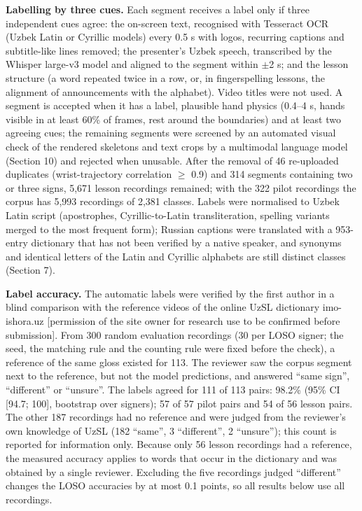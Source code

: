 \documentclass[a4paper,fleqn]{cas-dc}
\begin{document}
\textbf{Labelling by three cues.} Each segment receives a label only if three independent cues agree: the on-screen text, recognised with Tesseract OCR \cite{2007_smith_tesseract} (Uzbek Latin or Cyrillic models) every 0.5 s with logos, recurring captions and subtitle-like lines removed; the presenter's Uzbek speech, transcribed by the Whisper large-v3 model \cite{2023_radford_whisper} and aligned to the segment within $\pm$2 s; and the lesson structure (a word repeated twice in a row, or, in fingerspelling lessons, the alignment of announcements with the alphabet). Video titles were not used. A segment is accepted when it has a label, plausible hand physics (0.4--4 s, hands visible in at least 60\% of frames, rest around the boundaries) and at least two agreeing cues; the remaining segments were screened by an automated visual check of the rendered skeletons and text crops by a multimodal language model (Section 10) and rejected when unusable. After the removal of 46 re-uploaded duplicates (wrist-trajectory correlation $\geq$ 0.9) and 314 segments containing two or three signs, 5,671 lesson recordings remained; with the 322 pilot recordings the corpus has 5,993 recordings of 2,381 classes. Labels were normalised to Uzbek Latin script (apostrophes, Cyrillic-to-Latin transliteration, spelling variants merged to the most frequent form); Russian captions were translated with a 953-entry dictionary that has not been verified by a native speaker, and synonyms and identical letters of the Latin and Cyrillic alphabets are still distinct classes (Section 7).

\textbf{Label accuracy.} The automatic labels were verified by the first author in a blind comparison with the reference videos of the online UzSL dictionary imo-ishora.uz {\color{red}[permission of the site owner for research use to be confirmed before submission]}. From 300 random evaluation recordings (30 per LOSO signer; the seed, the matching rule and the counting rule were fixed before the check), a reference of the same gloss existed for 113. The reviewer saw the corpus segment next to the reference, but not the model predictions, and answered ``same sign'', ``different'' or ``unsure''. The labels agreed for 111 of 113 pairs: 98.2\% (95\% CI {[}94.7; 100{]}, bootstrap over signers); 57 of 57 pilot pairs and 54 of 56 lesson pairs. The other 187 recordings had no reference and were judged from the reviewer's own knowledge of UzSL (182 ``same'', 3 ``different'', 2 ``unsure''); this count is reported for information only. Because only 56 lesson recordings had a reference, the measured accuracy applies to words that occur in the dictionary and was obtained by a single reviewer. Excluding the five recordings judged ``different'' changes the LOSO accuracies by at most 0.1 points, so all results below use all recordings.
\end{document}
